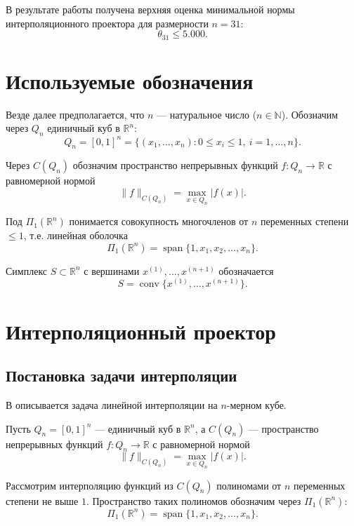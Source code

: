 \documentclass[a4paper,12pt]{article}
\theoremstyle{indented}
\begin{document}
В результате работы получена верхняя оценка минимальной нормы интерполяционного проектора для размерности $n = 31$:
\[
\theta_{31} \le 5.000.
\]

\newpage

\section{Используемые обозначения}

Везде далее предполагается, что $n$ — натуральное число ($n \in \mathbb{N}$). Обозначим через $Q_n$ единичный куб в $\mathbb{R}^n$:
\[
Q_n = [0,1]^n = \{(x_1, \dots, x_n) : 0 \le x_i \le 1,\ i = 1,\dots,n\}.
\]

Через $C(Q_n)$ обозначим пространство непрерывных функций $f : Q_n \to \mathbb{R}$ с равномерной нормой
\[
\|f\|_{C(Q_n)} = \max_{x \in Q_n} |f(x)|.
\]

Под $\Pi_1(\mathbb{R}^n)$ понимается совокупность многочленов от $n$ переменных степени $\le 1$, т.е. линейная оболочка
\[
\Pi_1(\mathbb{R}^n) = \operatorname{span}\{1, x_1, x_2, \dots, x_n\}.
\]

Симплекс $S \subset \mathbb{R}^n$ с вершинами $x^{(1)}, \dots, x^{(n+1)}$ обозначается
\[
S = \operatorname{conv}\{x^{(1)}, \dots, x^{(n+1)}\}.
\]

\section{Интерполяционный проектор}

\subsection{Постановка задачи интерполяции}

В \cite{nevsky_geo} описывается задача линейной интерполяции на $n$-мерном кубе.
\par
Пусть $Q_n = [0,1]^n$ — единичный куб в $\mathbb{R}^n$, а $C(Q_n)$ — пространство непрерывных функций $f: Q_n \to \mathbb{R}$ с равномерной нормой
\[
\|f\|_{C(Q_n)} = \max_{x \in Q_n} |f(x)|.
\]

Рассмотрим интерполяцию функций из $C(Q_n)$ полиномами от $n$ переменных степени не выше $1$. Пространство таких полиномов обозначим через $\Pi_1(\mathbb{R}^n)$:
\[
\Pi_1(\mathbb{R}^n) = \operatorname{span}\{1, x_1, x_2, \dots, x_n\}.
\]
\end{document}
